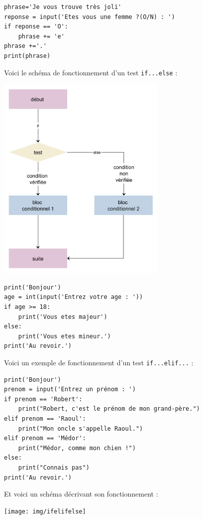 \begin{pyc}
	\begin{verbatim}
phrase='Je vous trouve très joli'
reponse = input('Etes vous une femme ?(O/N) : ')
if reponse == 'O':
    phrase += 'e'
phrase +='.'
print(phrase)
\end{verbatim}
\end{pyc}

Voici le schéma de fonctionnement d'un test \texttt{if...else} :
\begin{center}
	\includegraphics[height=10cm]{img/ifelse}
\end{center}

\begin{pyc}
	\begin{verbatim}
print('Bonjour')
age = int(input('Entrez votre age : '))
if age >= 18:
    print('Vous etes majeur')
else:
    print('Vous etes mineur.')
print('Au revoir.')
\end{verbatim}
\end{pyc}

Voici un exemple de fonctionnement d'un test \texttt{if...elif...} :
\begin{pyc}
	\begin{verbatim}
print('Bonjour')
prenom = input('Entrez un prénom : ')
if prenom == 'Robert':
    print("Robert, c'est le prénom de mon grand-père.")
elif prenom == 'Raoul':
    print("Mon oncle s'appelle Raoul.")
elif prenom == 'Médor':
    print("Médor, comme mon chien !")
else:
    print("Connais pas")
print('Au revoir.')
\end{verbatim}
\end{pyc}
Et voici un schéma décrivant son fonctionnement :
\begin{center}
	\texttt{[image: img/ifelifelse]}
\end{center}




